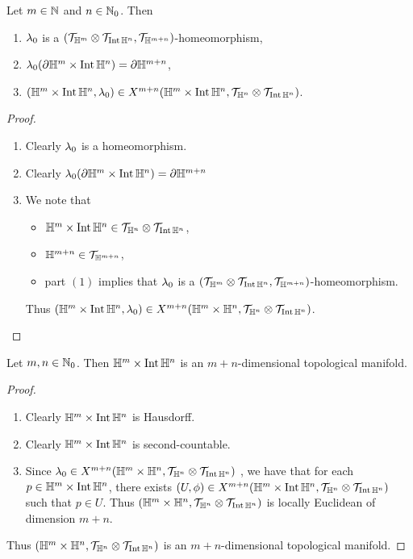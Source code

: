 \documentclass{book}
\begin{document}
\begin{ex} 
	Let $m \in \N$ and $n \in \N_0$. Then 
	\begin{enumerate}
		\item $\lam_0$ is a $(\MT_{\H^m} \otimes \MT_{\Int \H^n}, \MT_{\H^{m+n}})$-homeomorphism,
		\item $\lam_0(\p \H^m \times \Int \H^n) = \p \H^{m+n}$,
		\item $(\H^m \times \Int \H^n, \lam_0) \in X^{m+n}(\H^m \times \Int \H^n, \MT_{\H^n} \otimes \MT_{\Int \H^n})$.
	\end{enumerate}
\end{ex}

\begin{proof}\
	\begin{enumerate}
		\item Clearly $\lam_0$ is a homeomorphism.
		\item Clearly $\lam_0(\p \H^m \times \Int \H^n) = \p \H^{m+n}$
		\item We note that
		\begin{itemize}
			\item $\H^m \times \Int \H^n \in \MT_{\H^n} \otimes \MT_{\Int \H^n}$,
			\item $\H^{m+n} \in \MT_{\H^{m+n}}$,
			\item part $(1)$ implies that $\lam_0$ is a $(\MT_{\H^m} \otimes \MT_{\Int \H^n}, \MT_{\H^{m+n}})$-homeomorphism.
		\end{itemize}
		Thus $(\H^m \times \Int \H^n, \lam_0) \in X^{m+n}(\H^m \times \H^n, \MT_{\H^n} \otimes \MT_{\Int \H^n})$.
	\end{enumerate}
\end{proof}

\begin{ex} 
	Let $m, n \in \N_0$. Then $\H^m \times \Int \H^n$ is an $m+n$-dimensional topological manifold.
\end{ex}

\begin{proof} \
	\begin{enumerate}
		\item Clearly $\H^m \times \Int \H^n$ is Hausdorff.
		\item Clearly $\H^m \times \Int \H^n$ is second-countable.
		\item Since $\lam_0 \in X^{m+n}(\H^m \times \H^n, \MT_{\H^n} \otimes \MT_{\Int \H^n})$ , we have that for each $p \in \H^m \times \Int \H^n$, there exists $(U, \phi) \in X^{m+n}(\H^m \times \Int \H^n, \MT_{\H^n} \otimes \MT_{\Int \H^n})$ such that $p \in U$. Thus $(\H^m \times \H^n, \MT_{\H^n} \otimes \MT_{\Int \H^n})$ is locally Euclidean of dimension $m+n$.
	\end{enumerate}
	Thus $(\H^m \times \H^n, \MT_{\H^n} \otimes \MT_{\Int \H^n})$ is an $m+n$-dimensional topological manifold.
\end{proof}
\end{document}
